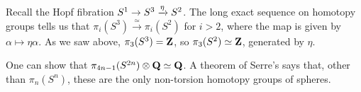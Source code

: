 \begin{example}
    Recall the Hopf fibration $S^1\to S^3\xrightarrow{{\eta}} S^2$.
    The long exact sequence on homotopy groups tells us that
    $\pi_i(S^3)\xrightarrow{\simeq}\pi_i(S^2)$ for $i>2$, where the map is given by
    $\alpha\mapsto\eta\alpha$.
    As we saw above, $\pi_3(S^3) = \mathbf Z$, so $\pi_3(S^2)\simeq \mathbf Z$, generated by $\eta$.
    
    One can show that $\pi_{4n-1}(S^{2n})\otimes\mathbf Q\simeq \mathbf Q$.
    A theorem of Serre's says that, other than $\pi_n(S^n)$, these are the only non-torsion homotopy groups of spheres.
\end{example}
